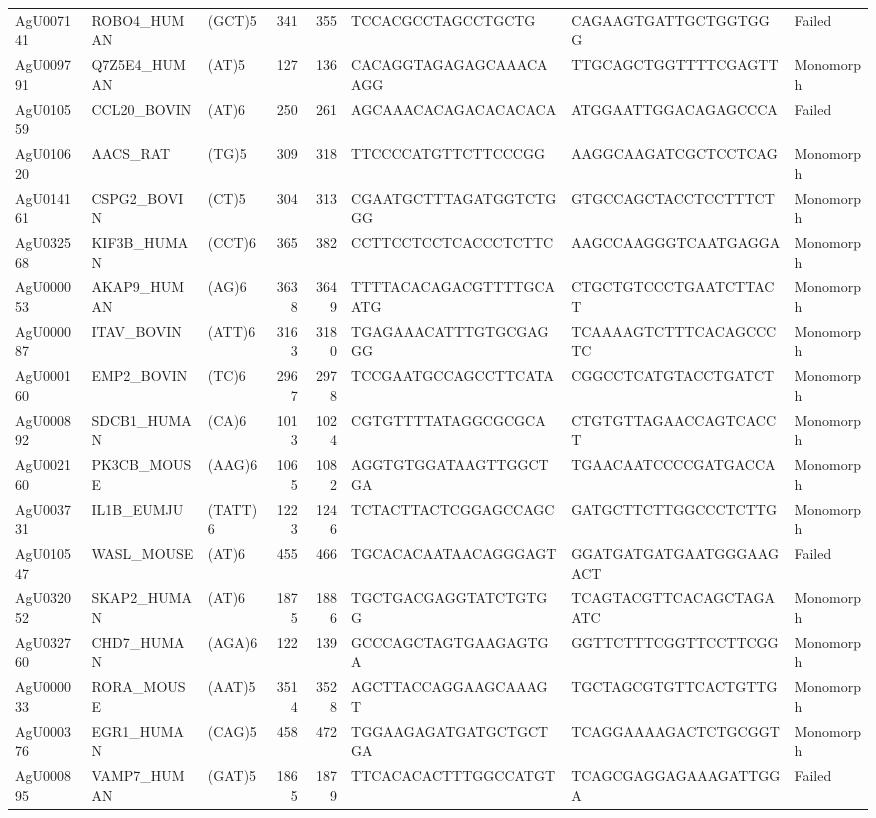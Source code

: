 \documentclass[]{article}
\begin{document}
\begin{longtable}[t]{lllrrlll}
AgU007141 & ROBO4\_HUMAN & (GCT)5 & 341 & 355 & TCCACGCCTAGCCTGCTG & CAGAAGTGATTGCTGGTGGG & Failed\\
\addlinespace
AgU009791 & Q7Z5E4\_HUMAN & (AT)5 & 127 & 136 & CACAGGTAGAGAGCAAACAAGG & TTGCAGCTGGTTTTCGAGTT & Monomorph\\
AgU010559 & CCL20\_BOVIN & (AT)6 & 250 & 261 & AGCAAACACAGACACACACA & ATGGAATTGGACAGAGCCCA & Failed\\
AgU010620 & AACS\_RAT & (TG)5 & 309 & 318 & TTCCCCATGTTCTTCCCGG & AAGGCAAGATCGCTCCTCAG & Monomorph\\
AgU014161 & CSPG2\_BOVIN & (CT)5 & 304 & 313 & CGAATGCTTTAGATGGTCTGGG & GTGCCAGCTACCTCCTTTCT & Monomorph\\
AgU032568 & KIF3B\_HUMAN & (CCT)6 & 365 & 382 & CCTTCCTCCTCACCCTCTTC & AAGCCAAGGGTCAATGAGGA & Monomorph\\
\addlinespace
AgU000053 & AKAP9\_HUMAN & (AG)6 & 3638 & 3649 & TTTTACACAGACGTTTTGCAATG & CTGCTGTCCCTGAATCTTACT & Monomorph\\
AgU000087 & ITAV\_BOVIN & (ATT)6 & 3163 & 3180 & TGAGAAACATTTGTGCGAGGG & TCAAAAGTCTTTCACAGCCCTC & Monomorph\\
AgU000160 & EMP2\_BOVIN & (TC)6 & 2967 & 2978 & TCCGAATGCCAGCCTTCATA & CGGCCTCATGTACCTGATCT & Monomorph\\
AgU000892 & SDCB1\_HUMAN & (CA)6 & 1013 & 1024 & CGTGTTTTATAGGCGCGCA & CTGTGTTAGAACCAGTCACCT & Monomorph\\
AgU002160 & PK3CB\_MOUSE & (AAG)6 & 1065 & 1082 & AGGTGTGGATAAGTTGGCTGA & TGAACAATCCCCGATGACCA & Monomorph\\
\addlinespace
AgU003731 & IL1B\_EUMJU & (TATT)6 & 1223 & 1246 & TCTACTTACTCGGAGCCAGC & GATGCTTCTTGGCCCTCTTG & Monomorph\\
AgU010547 & WASL\_MOUSE & (AT)6 & 455 & 466 & TGCACACAATAACAGGGAGT & GGATGATGATGAATGGGAAGACT & Failed\\
AgU032052 & SKAP2\_HUMAN & (AT)6 & 1875 & 1886 & TGCTGACGAGGTATCTGTGG & TCAGTACGTTCACAGCTAGAATC & Monomorph\\
AgU032760 & CHD7\_HUMAN & (AGA)6 & 122 & 139 & GCCCAGCTAGTGAAGAGTGA & GGTTCTTTCGGTTCCTTCGG & Monomorph\\
AgU000033 & RORA\_MOUSE & (AAT)5 & 3514 & 3528 & AGCTTACCAGGAAGCAAAGT & TGCTAGCGTGTTCACTGTTG & Monomorph\\
\addlinespace
AgU000376 & EGR1\_HUMAN & (CAG)5 & 458 & 472 & TGGAAGAGATGATGCTGCTGA & TCAGGAAAAGACTCTGCGGT & Monomorph\\
AgU000895 & VAMP7\_HUMAN & (GAT)5 & 1865 & 1879 & TTCACACACTTTGGCCATGT & TCAGCGAGGAGAAAGATTGGA & Failed\\

\end{longtable}
\end{document}
